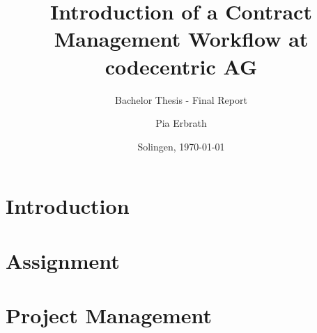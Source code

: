 

\usepackage[pagewise,modulo]{lineno}

\title{Introduction of a Contract Management Workflow \newline at codecentric AG}
\subtitle{Bachelor Thesis - Final Report}
\author{Pia Erbrath}
\def\place{Solingen}
\date{\place, \today}

\def\documentname{Interim Report for Bachelor Thesis}
\def\studentname{Pia Erbrath}
\def\snumber{2300869}
\def\course{Informatics - Software Engineering}
\def\period{February 2018 - July 2018}
\def\companyname{codecentric AG}
\def\companyaddress{Hochstr. 11}
\def\companypostcodecity{42697, Solingen}
\def\companycountry{Germany}
\def\companycoach{Niko Bl\"attermann}
\def\companycoachmail{niko.blaettermann@codecentric.de}
\def\universitytutor{Ferd van Odenhoven}
\def\universitytutormail{f.vanodenhoven@fontys.nl}
\def\examinator{C. Holz}
\def\externalexpert{H. Schuren}
\def\hasnda{no}



\makeglossaries


	\maketitle
	\pagestyle{plain}
	
	\newpage
	
	\newpage
	
	\newpage
	
	\tableofcontents
	\listoftables
	\listoffigures
	\newpage
	
	\newpage
	\pagestyle{ownstyle}
	
	\linenumbers %
	
	\chapter{Introduction}
	
	
	\chapter{Assignment}
	
	
	\chapter{Project Management}
	
	
